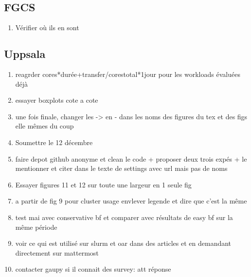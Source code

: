 \documentclass[a4paper]{article}
\begin{document}
	\subsection{FGCS}
		\begin{enumerate}
			\item Vérifier où ils en sont
		\end{enumerate}
	\subsection{Uppsala}
		\begin{enumerate}
		enlever fig de nb de data reuse?
		à propos des tailles des nœuds différentes, en fait je me dis qu'on pourrait aussi bien ne pas en parler du tout
[00:34]
partir directement de l'hypothèse que les nœuds sont de la même taille
[00:34]
ce qui est quand même très courant pour un cluster

@youpi
les figures 16 et 19, apparemment il y a du blanc en trop en haut du dessin

			\item reagrder cores*durée+transfer/corestotal*1jour pour les workloads évaluées déjà
			\item essayer boxplots cote a cote
		
			\item une fois finale, changer les -> en - dans les noms des figures du tex et des figs elle mêmes du coup
			\item Soumettre le 12 décembre
			\item faire depot github anonyme et clean le code + proposer deux trois expés + le mentionner et citer dans le texte de settings avec url mais pas de noms
			\item Essayer figures 11 et 12 sur toute une largeur en 1 seule fig 
			\item a partir de fig 9 pour cluster usage envlever legende et dire que c'est la même



			
			
			
			
			
			
			
			
			
			
			
			\item test mai avec conservative bf et comparer avec résultats de easy bf sur la même période
			\item voir ce qui est utilisé sur slurm et oar dans des articles et en demandant directement sur mattermost
			\item contacter gaupy si il connait des survey: att réponse
			

\end{enumerate}
\end{document}
